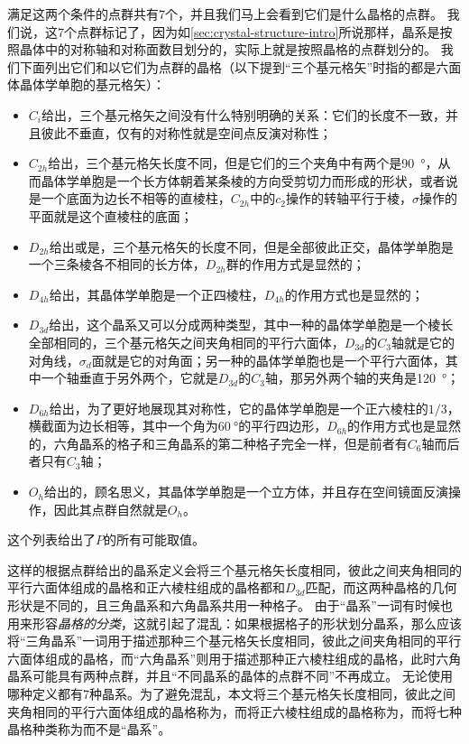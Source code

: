 满足这两个条件的点群共有7个，并且我们马上会看到它们是什么晶格的点群。
我们说，这7个点群标记了，因为如\autoref{sec:crystal-structure-intro}所说那样，晶系是按照晶体中的对称轴和对称面数目划分的，实际上就是按照晶格的点群划分的。
我们下面列出它们和以它们为点群的晶格（以下提到“三个基元格矢”时指的都是六面体晶体学单胞的基元格矢）：
\begin{itemize}
    \item $C_i$给出，三个基元格矢之间没有什么特别明确的关系：它们的长度不一致，并且彼此不垂直，仅有的对称性就是空间点反演对称性；
    \item $C_{2h}$给出，三个基元格矢长度不同，但是它们的三个夹角中有两个是\SI{90}{\degree}，从而晶体学单胞是一个长方体朝着某条棱的方向受剪切力而形成的形状，或者说是一个底面为边长不相等的直棱柱，$C_{2h}$中的$c_2$操作的转轴平行于棱，$\sigma$操作的平面就是这个直棱柱的底面；
    \item $D_{2h}$给出或是，三个基元格矢的长度不同，但是全部彼此正交，晶体学单胞是一个三条棱各不相同的长方体，$D_{2h}$群的作用方式是显然的；
    \item $D_{4h}$给出，其晶体学单胞是一个正四棱柱，$D_{4h}$的作用方式也是显然的；
    \item $D_{3d}$给出，这个晶系又可以分成两种类型，其中一种的晶体学单胞是一个棱长全部相同的，三个基元格矢之间夹角相同的平行六面体，$D_{3d}$的$C_3$轴就是它的对角线，$\sigma_d$面就是它的对角面；另一种的晶体学单胞也是一个平行六面体，其中一个轴垂直于另外两个，它就是$D_{3d}$的$C_3$轴，那另外两个轴的夹角是\SI{120}{\degree}；
    \item $D_{6h}$给出，为了更好地展现其对称性，它的晶体学单胞是一个正六棱柱的$1/3$，横截面为边长相等，其中一个角为$\SI{60}{\degree}$的平行四边形，$D_{6h}$的作用方式也是显然的，六角晶系的格子和三角晶系的第二种格子完全一样，但是前者有$C_6$轴而后者只有$C_3$轴；
    \item $O_h$给出的，顾名思义，其晶体学单胞是一个立方体，并且存在空间镜面反演操作，因此其点群自然就是$O_h$。
\end{itemize}
这个列表给出了$P$的所有可能取值。

这样的根据点群给出的晶系定义会将三个基元格矢长度相同，彼此之间夹角相同的平行六面体组成的晶格和正六棱柱组成的晶格都和$D_{3d}$匹配，而这两种晶格的几何形状是不同的，且三角晶系和六角晶系共用一种格子。
由于“晶系”一词有时候也用来形容\emph{晶格的分类}，这就引起了混乱：如果根据格子的形状划分晶系，那么应该将“三角晶系”一词用于描述那种三个基元格矢长度相同，彼此之间夹角相同的平行六面体组成的晶格，而“六角晶系”则用于描述那种正六棱柱组成的晶格，此时六角晶系可能具有两种点群，并且“不同晶系的晶体的点群不同”不再成立。
无论使用哪种定义都有7种晶系。为了避免混乱，本文将三个基元格矢长度相同，彼此之间夹角相同的平行六面体组成的晶格称为，而将正六棱柱组成的晶格称为，而将七种晶格种类称为而不是“晶系”。

